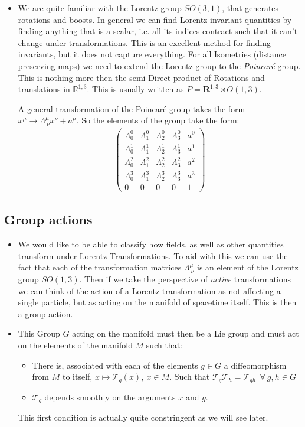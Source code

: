 \documentclass[11pt]{article}
\numberwithin{equation}{section}
\begin{document}
  \begin{itemize}
    \item  We are quite familiar with the Lorentz group $SO(3,1)$, that generates rotations and boosts. In general we can find Lorentz invariant quantities by finding anything that is a scalar, i.e. all its indices contract such that it can't change under transformations. This is an excellent method for finding invariants, but it does not capture everything. For all Isometries (distance preserving maps) we need to extend the Lorentz group to the \emph{Poincar\'e} group. This is nothing more then the semi-Direct product of Rotations and translations in $\mathbb{R}^{1,3}$. This is usually written as $P = \textbf{R}^{1,3} \rtimes O(1,3)$. 

    A general transformation of the Poincar\'e group takes the form $x^{\mu} \rightarrow \Lambda^{\mu}_{~\nu}x^{\nu}+a^{\mu}$. So the elements of the group take the form:
    \begin{align*}
      \begin{pmatrix}
      \Lambda^0_0 & \Lambda^0_1 & \Lambda^0_2 & \Lambda^0_3 & a^0 \\
\Lambda^1_0 & \Lambda^1_1 & \Lambda^1_2 & \Lambda^1_3 & a^1 \\
\Lambda^2_0 & \Lambda^2_1 & \Lambda^2_2 & \Lambda^2_3 & a^2 \\
\Lambda^3_0 & \Lambda^3_1 & \Lambda^3_2 & \Lambda^3_3 & a^3 \\
0 & 0 & 0 & 0 & 1
\end{pmatrix}
\end{align*}
\end{itemize}


    \subsection{Group actions}
\begin{itemize}
  \item We would like to be able to classify how fields, as well as other quantities transform under Lorentz Transformations. To aid with this we can use the fact that each of the transformation matrices $\Lambda^{\mu}_{~\nu}$ is an element of the Lorentz group $SO(1,3)$. Then if we take the perspective of \emph{active} transformations we can think of the action of a Lorentz transformation as not affecting a single particle, but as acting on the manifold of spacetime itself. This is then a group action.

     \item This Group $G$ acting on the manifold must then be a Lie group and must act on the elements of the manifold $M$ such that:
     \begin{itemize}
       \item There is, associated with each of the elements $g \in G$ a diffeomorphism from $M$ to itself, $x \mapsto \mathcal{T}_{g}(x),~x\in M$. Such that $\mathcal{T}_{g}\mathcal{T}_{h}=\mathcal{T}_{gh}~~\forall~ g,h \in G$ 
       \item $\mathcal{T}_{g}$ depends smoothly on the arguments $x$ and $g$. 
     \end{itemize}
     This first condition is actually quite constringent as we will see later.
     \end{itemize}
\end{document}

